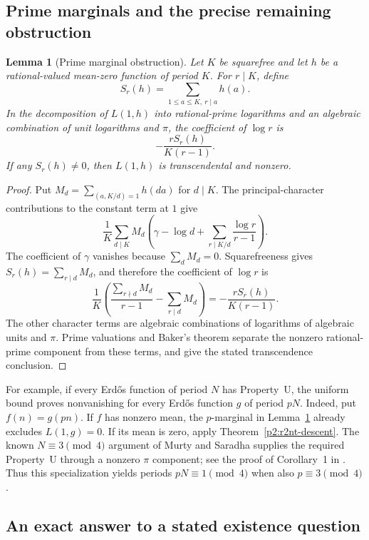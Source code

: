 \documentclass[11pt,a4paper]{article}
\newtheorem{lemma}[theorem]{Lemma}
\theoremstyle{definition}
\theoremstyle{remark}
\numberwithin{equation}{section}
\begin{document}
\subsection{Prime marginals and the precise remaining obstruction}

\begin{lemma}[Prime marginal obstruction]
\label{p2:r2nt-prime-marginals}
Let $K$ be squarefree and let $h$ be a rational-valued mean-zero
function of period $K$.  For $r\mid K$, define
\[
 S_r(h)=\sum_{1\le a\le K,\ r\mid a}h(a).
\]
In the decomposition of $L(1,h)$ into rational-prime logarithms
and an algebraic combination of unit logarithms and $\pi$, the
coefficient of $\log r$ is
\[
 -\frac{r S_r(h)}{K(r-1)}.
\]
If any $S_r(h)\ne0$, then $L(1,h)$ is transcendental and nonzero.
\end{lemma}
\begin{proof}
Put $M_d=\sum_{(a,K/d)=1}h(da)$ for $d\mid K$.
The principal-character contributions to the constant term at $1$
give
\[
 \frac1K\sum_{d\mid K}M_d
 \left(\gamma-\log d+
             \sum_{r\mid K/d}\frac{\log r}{r-1}\right).
\]
The coefficient of $\gamma$ vanishes because
$\sum_dM_d=0$.  Squarefreeness gives
$S_r(h)=\sum_{r\mid d}M_d$, and therefore the coefficient of
$\log r$ is
\[
 \frac1K\left(\frac{\sum_{r\nmid d}M_d}{r-1}
                    -\sum_{r\mid d}M_d\right)
 =-\frac{rS_r(h)}{K(r-1)}.
\]
The other character terms are algebraic combinations of logarithms
of algebraic units and $\pi$.  Prime valuations and Baker's theorem
separate the nonzero rational-prime component from these terms,
and give the stated transcendence conclusion.
\end{proof}

For example, if every Erd\H{o}s function of period $N$ has
Property~U, the uniform bound proves nonvanishing for every
Erd\H{o}s function $g$ of period $pN$.  Indeed, put $f(n)=g(pn)$.
If $f$ has nonzero mean, the $p$-marginal in
Lemma~\ref{p2:r2nt-prime-marginals} already excludes $L(1,g)=0$.
If its mean is zero, apply Theorem~\ref{p2:r2nt-descent}.
The known $N\equiv3\pmod4$ argument of Murty and Saradha supplies
the required Property~U through a nonzero $\pi$ component;
see the proof of Corollary~1 in \cite{p2:Bharadwaj2022}.
Thus this specialization yields periods $pN\equiv1\pmod4$ when
also $p\equiv3\pmod4$.

\subsection{An exact answer to a stated existence question}
\label{p2:r2nt-existence-subsection}
\end{document}
